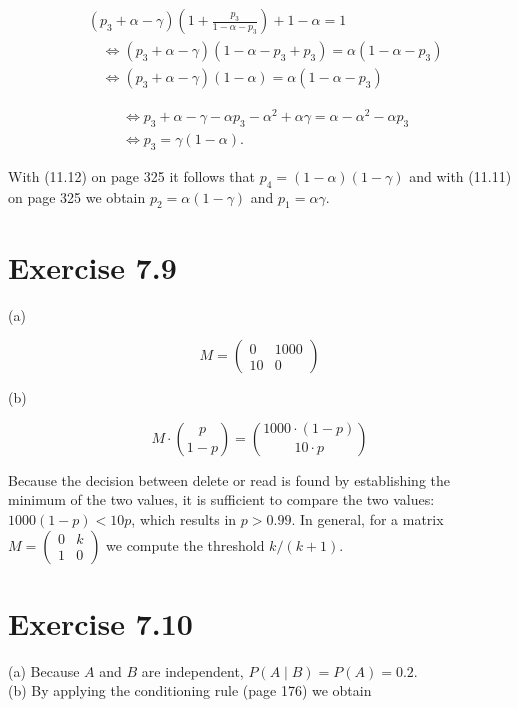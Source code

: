 \documentclass[10pt]{book}
\begin{document}
\begin{center}
\begin{enumerate}
\begin{center}
\begin{center}
\begin{center}
\begin{center}
\begin{center}
\begin{align*}
& \left(p_{3}+\alpha-\gamma\right)\left(1+\frac{p_{3}}{1-\alpha-p_{3}}\right)+1-\alpha=1  \tag{11.13}\\
& \quad \Leftrightarrow\left(p_{3}+\alpha-\gamma\right)\left(1-\alpha-p_{3}+p_{3}\right)=\alpha\left(1-\alpha-p_{3}\right)  \tag{11.14}\\
& \quad \Leftrightarrow\left(p_{3}+\alpha-\gamma\right)(1-\alpha)=\alpha\left(1-\alpha-p_{3}\right) \tag{11.15}
\end{align*}



\begin{align*}
& \Leftrightarrow p_{3}+\alpha-\gamma-\alpha p_{3}-\alpha^{2}+\alpha \gamma=\alpha-\alpha^{2}-\alpha p_{3}  \tag{11.16}\\
& \Leftrightarrow p_{3}=\gamma(1-\alpha) . \tag{11.17}
\end{align*}


With (11.12) on page 325 it follows that $p_{4}=(1-\alpha)(1-\gamma)$ and with (11.11) on page 325 we obtain $p_{2}=\alpha(1-\gamma)$ and $p_{1}=\alpha \gamma$.

\section*{Exercise 7.9}
(a)

$$
M=\left(\begin{array}{cc}
0 & 1000 \\
10 & 0
\end{array}\right)
$$

(b)

$$
M \cdot\binom{p}{1-p}=\binom{1000 \cdot(1-p)}{10 \cdot p}
$$

Because the decision between delete or read is found by establishing the minimum of the two values, it is sufficient to compare the two values: $1000(1-p)<10 p$, which results in $p>0.99$. In general, for a matrix $M=\left(\begin{array}{ll}0 & k \\ 1 & 0\end{array}\right)$ we compute the threshold $k /(k+1)$.

\section*{Exercise 7.10}
(a) Because $A$ and $B$ are independent, $P(A \mid B)=P(A)=0.2$.\\
(b) By applying the conditioning rule (page 176) we obtain


\end{center}
\end{center}
\end{center}
\end{center}
\end{center}
\end{enumerate}
\end{center}
\end{document}
